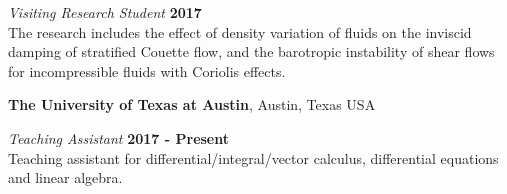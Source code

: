 \documentclass[margin,line]{res}
\newenvironment{list2}{
  \begin{list}{$\bullet$}{%
      \setlength{\itemsep}{0in}
      \setlength{\parsep}{0in} \setlength{\parskip}{0in}
      \setlength{\topsep}{0in} \setlength{\partopsep}{0in} 
      \setlength{\leftmargin}{0.2in}}}{\end{list}}
\begin{document}
\begin{resume}


{\em Visiting Research Student} \hfill {\bf 2017}\\
The research includes the effect of density variation of fluids on the inviscid damping of stratified Couette flow, and the barotropic instability of shear flows for incompressible fluids with Coriolis effects.

{\bf The University of Texas at Austin}, Austin, Texas USA

{\em Teaching Assistant} \hfill {\bf 2017 - Present}\\
Teaching assistant for differential/integral/vector calculus, differential equations and linear algebra.


\fi

\end{resume}
\end{document}
